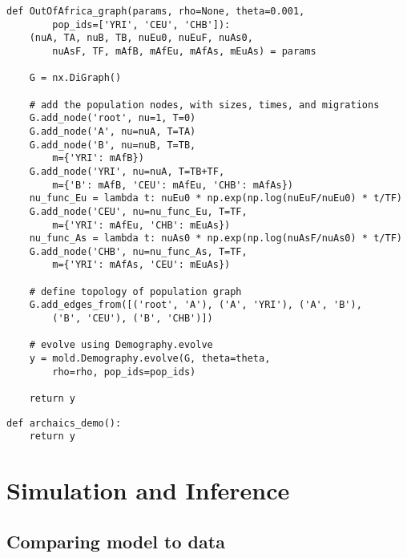 \documentclass[10pt]{article}
\makeatletter
\newcommand{\py}[1]{\lstinline[breaklines=true,language=Python, showstringspaces=False]@#1@}
\renewcommand{\lstlistingname}{Example Code}
\makeatother
\begin{document}
\begin{lstlisting}[caption={\textbf{Out of Africa Demography graph:} The same model as \lstlistingname~\ref{lst:ooa}, but defined using the Demography module. The Demography method takes advantage of the package \py{networkx}, which we \py{import networkx as nx}. Here, we define populations (nodes) with attributes (such as migration rates and sizes), and then define edges to relate populations.}, float, label={lst:ooa_demo}]
def OutOfAfrica_graph(params, rho=None, theta=0.001, 
        pop_ids=['YRI', 'CEU', 'CHB']):
    (nuA, TA, nuB, TB, nuEu0, nuEuF, nuAs0, 
        nuAsF, TF, mAfB, mAfEu, mAfAs, mEuAs) = params
    
    G = nx.DiGraph()
    
    # add the population nodes, with sizes, times, and migrations
    G.add_node('root', nu=1, T=0)
    G.add_node('A', nu=nuA, T=TA)
    G.add_node('B', nu=nuB, T=TB, 
        m={'YRI': mAfB})
    G.add_node('YRI', nu=nuA, T=TB+TF, 
        m={'B': mAfB, 'CEU': mAfEu, 'CHB': mAfAs})
    nu_func_Eu = lambda t: nuEu0 * np.exp(np.log(nuEuF/nuEu0) * t/TF)
    G.add_node('CEU', nu=nu_func_Eu, T=TF, 
        m={'YRI': mAfEu, 'CHB': mEuAs})
    nu_func_As = lambda t: nuAs0 * np.exp(np.log(nuAsF/nuAs0) * t/TF)
    G.add_node('CHB', nu=nu_func_As, T=TF, 
        m={'YRI': mAfAs, 'CEU': mEuAs})
        
    # define topology of population graph
    G.add_edges_from([('root', 'A'), ('A', 'YRI'), ('A', 'B'),
        ('B', 'CEU'), ('B', 'CHB')])
        
    # evolve using Demography.evolve
    y = mold.Demography.evolve(G, theta=theta, 
        rho=rho, pop_ids=pop_ids)
        
    return y
\end{lstlisting}

\begin{lstlisting}[caption={\textbf{Archaic Hominin Demography:}}, float, label={lst:archaic_demo}]
def archaics_demo():
    return y
\end{lstlisting}

\clearpage

\section{Simulation and Inference}


\subsection{Comparing model to data}
\end{document}
